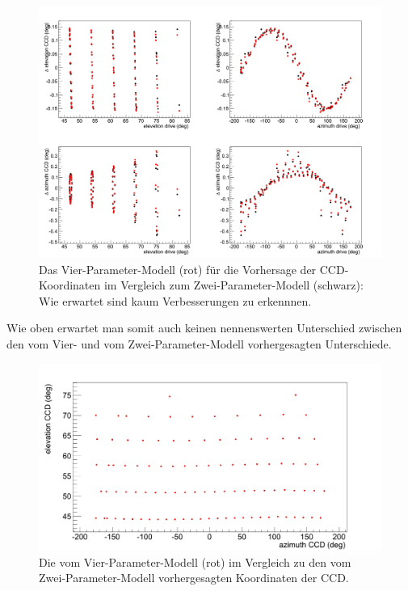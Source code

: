 \begin{figure}[htbp]
\centering
\includegraphics[width=\textwidth]{../341/D2C44comp.png}
\caption{Das Vier-Parameter-Modell (rot) für die Vorhersage der CCD-Koordinaten im Vergleich zum Zwei-Parameter-Modell (schwarz): Wie erwartet sind kaum Verbesserungen zu erkennnen.}
\label{img:D2C4comp}
\end{figure}
Wie oben erwartet man somit auch keinen nennenswerten Unterschied zwischen den vom Vier- und vom Zwei-Parameter-Modell vorhergesagten Unterschiede.
\begin{figure}[htbp]
\centering
\includegraphics[width=\textwidth]{../341/D2C44comp2.png}
\caption{Die vom Vier-Parameter-Modell (rot) im Vergleich zu den vom Zwei-Parameter-Modell vorhergesagten Koordinaten der CCD.}
\label{img:D2C4comp2}
\end{figure}

